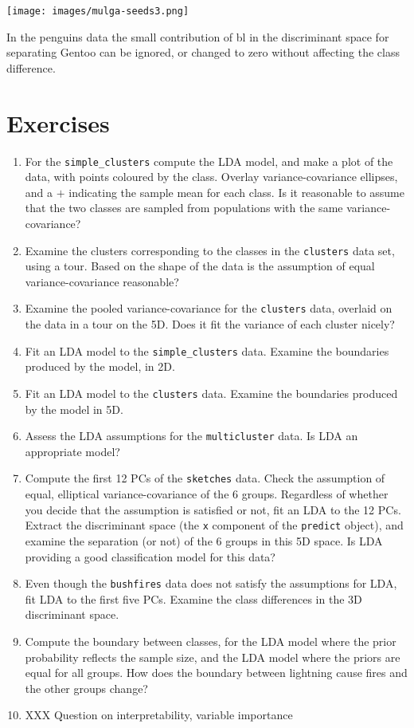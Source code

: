 \documentclass[
  letterpaper,
]{krantz}
\providecommand{\tightlist}{%
  \setlength{\itemsep}{0pt}\setlength{\parskip}{0pt}}\usepackage{longtable,booktabs,array}
\newcommand{\insightbox}[1]{%
\noindent\colorbox{insight!30}{%
\begin{minipage}{0.98\textwidth}%
    \centering%
    \begin{minipage}[c]{0.15\textwidth} %
      \texttt{[image: images/mulga-seeds3.png]} %
    \end{minipage}%
    \hfill %
    \begin{minipage}[c]{0.8\textwidth} %
      \bigskip%
      \textsf{#1}%
      \bigskip%
    \end{minipage}%
    \hspace*{3mm}%
  \end{minipage}%
}%
}
\begin{document}
\insightbox{In the penguins data the small contribution of \textsf{bl} in the discriminant space for separating Gentoo can be ignored, or changed to zero without affecting the class difference.}

\section*{Exercises}\label{exercises-13}


 
  

\begin{enumerate}
\def\labelenumi{\arabic{enumi}.}
\tightlist
\item
  For the \texttt{simple\_clusters} compute the LDA model, and make a
  plot of the data, with points coloured by the class. Overlay
  variance-covariance ellipses, and a \(+\) indicating the sample mean
  for each class. Is it reasonable to assume that the two classes are
  sampled from populations with the same variance-covariance?
\item
  Examine the clusters corresponding to the classes in the
  \texttt{clusters} data set, using a tour. Based on the shape of the
  data is the assumption of equal variance-covariance reasonable?
\item
  Examine the pooled variance-covariance for the \texttt{clusters} data,
  overlaid on the data in a tour on the 5D. Does it fit the variance of
  each cluster nicely?
\item
  Fit an LDA model to the \texttt{simple\_clusters} data. Examine the
  boundaries produced by the model, in 2D.
\item
  Fit an LDA model to the \texttt{clusters} data. Examine the boundaries
  produced by the model in 5D.
\item
  Assess the LDA assumptions for the \texttt{multicluster} data. Is LDA
  an appropriate model?
\item
  Compute the first 12 PCs of the \texttt{sketches} data. Check the
  assumption of equal, elliptical variance-covariance of the 6 groups.
  Regardless of whether you decide that the assumption is satisfied or
  not, fit an LDA to the 12 PCs. Extract the discriminant space (the
  \texttt{x} component of the \texttt{predict} object), and examine the
  separation (or not) of the 6 groups in this 5D space. Is LDA providing
  a good classification model for this data?
\item
  Even though the \texttt{bushfires} data does not satisfy the
  assumptions for LDA, fit LDA to the first five PCs. Examine the class
  differences in the 3D discriminant space.
\item
  Compute the boundary between classes, for the LDA model where the
  prior probability reflects the sample size, and the LDA model where
  the priors are equal for all groups. How does the boundary between
  lightning cause fires and the other groups change?
\item
  XXX Question on interpretability, variable importance
\end{enumerate}
\end{document}
